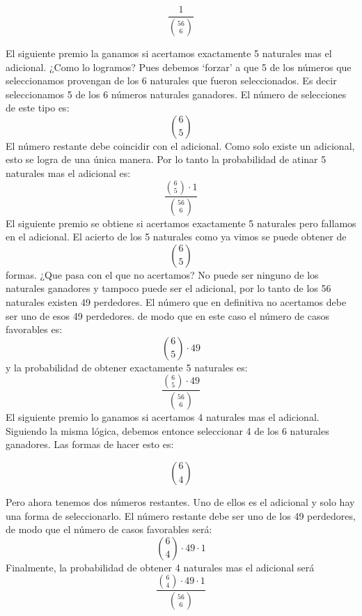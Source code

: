 \documentclass[14pt]{extreport}
\begin{document}
$$
\frac{1}{\binom{56}{6}}
$$

El siguiente premio la ganamos si acertamos exactamente 5 naturales mas el adicional. ¿Como lo logramos? Pues debemos `forzar' a que 5 de los números que seleccionamos provengan de los 6 naturales que fueron seleccionados. Es decir seleccionamos 5 de los 6 números naturales ganadores. El número de selecciones de este tipo es: 
$$
\binom{6}{5} 
$$
El número restante debe coincidir con el adicional. Como solo existe un adicional, esto se logra de una única manera. Por lo tanto la probabilidad de atinar 5 naturales mas el adicional es: 
$$
\frac{\binom{6}{5} \cdot 1}{\binom{56}{6}}
$$
El siguiente premio se obtiene si acertamos exactamente 5 naturales pero fallamos en el adicional. El acierto de los 5 naturales como ya vimos se puede obtener de
$$
\binom{6}{5}
$$ 
formas. ¿Que pasa con el que no acertamos? No puede ser ninguno de los naturales ganadores y tampoco puede ser el adicional, por lo tanto de los 56 naturales existen 49 perdedores. El número que en definitiva no acertamos debe ser uno de esos 49 perdedores. de modo que en este caso el número de casos favorables es: 
$$
\binom{6}{5}\cdot 49
$$
y la probabilidad de obtener exactamente 5 naturales es:
$$
\frac{\binom{6}{5}\cdot 49}{\binom{56}{6}}
$$
El siguiente premio lo ganamos si acertamos 4 naturales mas el adicional. Siguiendo la misma lógica, debemos entonce seleccionar 4 de los 6 naturales ganadores. Las formas de hacer esto es: 

$$
\binom{6}{4}
$$

Pero ahora tenemos dos números restantes. Uno de ellos es el adicional y solo hay una forma de seleccionarlo. El número restante debe ser uno de los 49 perdedores, de modo que el número de casos favorables será: 
$$
\binom{6}{4}\cdot 49 \cdot 1
$$
Finalmente, la probabilidad de obtener 4 naturales mas el adicional será
$$
\frac{\binom{6}{4}\cdot 49 \cdot 1}{\binom{56}{6}}
$$
\end{document}
